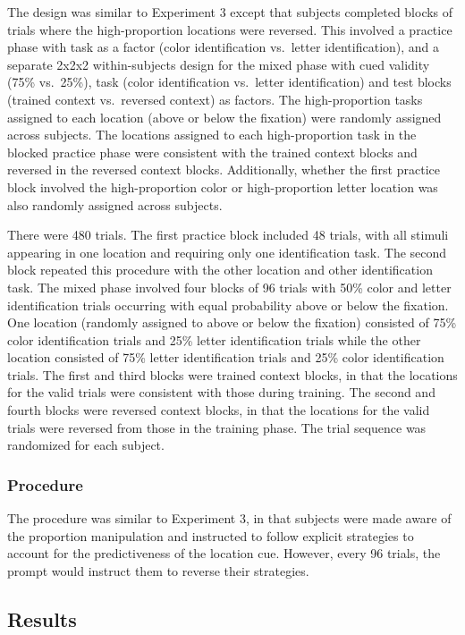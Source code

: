 \documentclass[english,,man,floatsintext]{apa6}
\begin{document}
The design was similar to Experiment 3 except that subjects completed
blocks of trials where the high-proportion locations were reversed. This
involved a practice phase with task as a factor (color identification
vs.~letter identification), and a separate 2x2x2 within-subjects design
for the mixed phase with cued validity (75\% vs.~25\%), task (color
identification vs.~letter identification) and test blocks (trained
context vs.~reversed context) as factors. The high-proportion tasks
assigned to each location (above or below the fixation) were randomly
assigned across subjects. The locations assigned to each high-proportion
task in the blocked practice phase were consistent with the trained
context blocks and reversed in the reversed context blocks.
Additionally, whether the first practice block involved the
high-proportion color or high-proportion letter location was also
randomly assigned across subjects.

There were 480 trials. The first practice block included 48 trials, with
all stimuli appearing in one location and requiring only one
identification task. The second block repeated this procedure with the
other location and other identification task. The mixed phase involved
four blocks of 96 trials with 50\% color and letter identification
trials occurring with equal probability above or below the fixation. One
location (randomly assigned to above or below the fixation) consisted of
75\% color identification trials and 25\% letter identification trials
while the other location consisted of 75\% letter identification trials
and 25\% color identification trials. The first and third blocks were
trained context blocks, in that the locations for the valid trials were
consistent with those during training. The second and fourth blocks were
reversed context blocks, in that the locations for the valid trials were
reversed from those in the training phase. The trial sequence was
randomized for each subject.

\subsubsection{Procedure}\label{procedure-3}

The procedure was similar to Experiment 3, in that subjects were made
aware of the proportion manipulation and instructed to follow explicit
strategies to account for the predictiveness of the location cue.
However, every 96 trials, the prompt would instruct them to reverse
their strategies.

\subsection{Results}\label{results-3}
\end{document}
